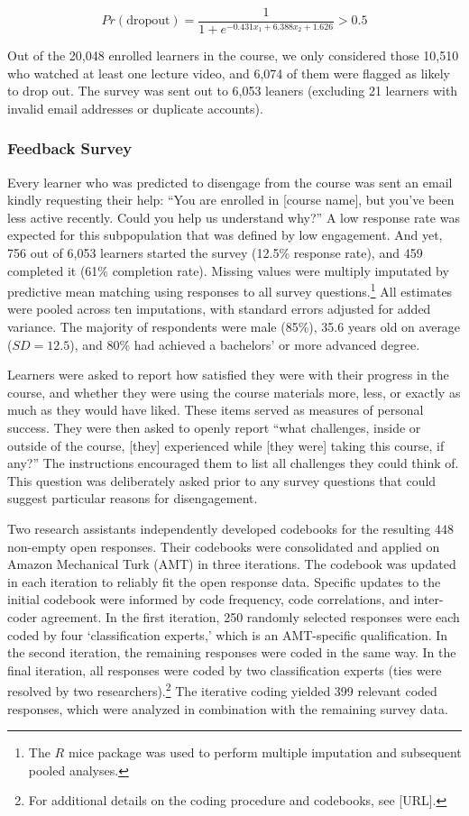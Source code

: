 \documentclass{sigchi}\usepackage[]{graphicx}\usepackage[]{color}
\begin{document}
\begin{equation}
Pr(\text{dropout}) = \frac{1}{1+e^{-0.431x_1 + 6.388x_2 + 1.626}} > 0.5
\end{equation}

Out of the 20,048 enrolled learners in the course, we only considered those 10,510 who watched at least one lecture video, and 6,074 of them were flagged as likely to drop out. The survey was sent out to 6,053 leaners (excluding 21 learners with invalid email addresses or duplicate accounts).


\subsubsection{Feedback Survey}

Every learner who was predicted to disengage from the course was sent an email kindly requesting their help: ``You are enrolled in [course name], but you've been less active recently. Could you help us understand why?'' A low response rate was expected for this subpopulation that was defined by low engagement. And yet, 756 out of 6,053 learners started the survey (12.5\% response rate), and 459 completed it (61\% completion rate). Missing values were multiply imputated by predictive mean matching using responses to all survey questions.\footnote{The $R$ mice package was used to perform multiple imputation and subsequent pooled analyses.} All estimates were pooled across ten imputations, with standard errors adjusted for added variance. The majority of respondents were male (85\%), 35.6 years old on average ($SD=12.5$), and 80\% had achieved a bachelors' or more advanced degree.

Learners were asked to report how satisfied they were with their progress in the course, and whether they were using the course materials more, less, or exactly as much as they would have liked. These items served as measures of personal success. They were then asked to openly report ``what challenges, inside or outside of the course, [they] experienced while [they were] taking this course, if any?'' The instructions encouraged them to list all challenges they could think of. This question was deliberately asked prior to any survey questions that could suggest particular reasons for disengagement.

Two research assistants independently developed codebooks for the resulting 448 non-empty open responses. Their codebooks were consolidated and applied on Amazon Mechanical Turk (AMT) in three iterations. The codebook was updated in each iteration to reliably fit the open response data. Specific updates to the initial codebook were informed by code frequency, code correlations, and inter-coder agreement. In the first iteration, 250 randomly selected responses were each coded by four `classification experts,' which is an AMT-specific qualification. In the second iteration, the remaining responses were coded in the same way. In the final iteration, all responses were coded by two classification experts (ties were resolved by two researchers).\footnote{For additional details on the coding procedure and codebooks, see [URL].} The iterative coding yielded 399 relevant coded responses, which were analyzed in combination with the remaining survey data.
\end{document}
